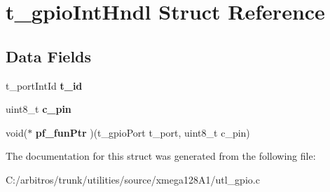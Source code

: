 \hypertarget{structt__gpio_int_hndl}{\section{t\-\_\-gpio\-Int\-Hndl Struct Reference}
\label{structt__gpio_int_hndl}
}
\subsection*{Data Fields}
\begin{DoxyCompactItemize}
\item 
\hypertarget{structt__gpio_int_hndl_ab1274b974fcd21339f3986c27cb64201}{t\-\_\-port\-Int\-Id {\bfseries t\-\_\-id}}\label{structt__gpio_int_hndl_ab1274b974fcd21339f3986c27cb64201}

\item 
\hypertarget{structt__gpio_int_hndl_a3cda2c30757cf10ea894dd09e081085d}{uint8\-\_\-t {\bfseries c\-\_\-pin}}\label{structt__gpio_int_hndl_a3cda2c30757cf10ea894dd09e081085d}

\item 
\hypertarget{structt__gpio_int_hndl_a09f8df47b88306f5df99f6c0c7044ff2}{void($\ast$ {\bfseries pf\-\_\-fun\-Ptr} )(t\-\_\-gpio\-Port t\-\_\-port, uint8\-\_\-t c\-\_\-pin)}\label{structt__gpio_int_hndl_a09f8df47b88306f5df99f6c0c7044ff2}

\end{DoxyCompactItemize}


The documentation for this struct was generated from the following file\-:\begin{DoxyCompactItemize}
\item 
C\-:/arbitros/trunk/utilities/source/xmega128\-A1/utl\-\_\-gpio.\-c\end{DoxyCompactItemize}
